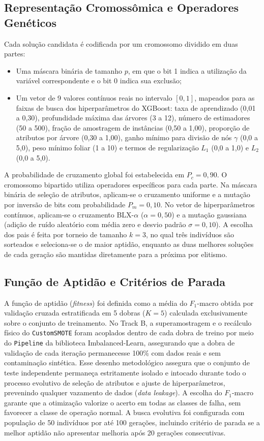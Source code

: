 \subsection{Representação Cromossômica e Operadores Genéticos}

Cada solução candidata é codificada por um cromossomo dividido em duas partes:
\begin{itemize}
    \item Uma máscara binária de tamanho $p$, em que o bit 1 indica a utilização da variável correspondente e o bit 0 indica sua exclusão;
    \item Um vetor de 9 valores contínuos reais no intervalo $[0, 1]$, mapeados para as faixas de busca dos hiperparâmetros do XGBoost: taxa de aprendizado (0,01 a 0,30), profundidade máxima das árvores (3 a 12), número de estimadores (50 a 500), fração de amostragem de instâncias (0,50 a 1,00), proporção de atributos por árvore (0,30 a 1,00), ganho mínimo para divisão de nós $\gamma$ (0,0 a 5,0), peso mínimo foliar (1 a 10) e termos de regularização $L_1$ (0,0 a 1,0) e $L_2$ (0,0 a 5,0).
\end{itemize}

A probabilidade de cruzamento global foi estabelecida em $P_c = 0,90$. O cromossomo bipartido utiliza operadores específicos para cada parte. Na máscara binária de seleção de atributos, aplicam-se o cruzamento uniforme e a mutação por inversão de bits com probabilidade $P_m = 0,10$. No vetor de hiperparâmetros contínuos, aplicam-se o cruzamento BLX-$\alpha$ ($\alpha = 0,50$) e a mutação gaussiana (adição de ruído aleatório com média zero e desvio padrão $\sigma = 0,10$). A escolha dos pais é feita por torneio de tamanho $k = 3$, no qual três indivíduos são sorteados e seleciona-se o de maior aptidão, enquanto as duas melhores soluções de cada geração são mantidas diretamente para a próxima por elitismo.

\subsection{Função de Aptidão e Critérios de Parada}

A função de aptidão (\textit{fitness}) foi definida como a média do $F_1$-macro obtida por validação cruzada estratificada em 5 dobras ($K = 5$) calculada exclusivamente sobre o conjunto de treinamento. No Track B, a superamostragem e o recálculo físico do \texttt{CustomSMOTE} foram acoplados dentro de cada dobra de treino por meio do \texttt{Pipeline} da biblioteca Imbalanced-Learn, assegurando que a dobra de validação de cada iteração permanecesse 100\% com dados reais e sem contaminação sintética. Esse desenho metodológico assegura que o conjunto de teste independente permaneça estritamente isolado e intocado durante todo o processo evolutivo de seleção de atributos e ajuste de hiperparâmetros, prevenindo qualquer vazamento de dados (\textit{data leakage}). A escolha do $F_1$-macro garante que a otimização valorize o acerto em todas as classes de falha, sem favorecer a classe de operação normal. A busca evolutiva foi configurada com população de 50 indivíduos por até 100 gerações, incluindo critério de parada se a melhor aptidão não apresentar melhoria após 20 gerações consecutivas.

